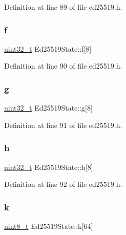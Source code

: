 Definition at line 89 of file ed25519.\+h.

\mbox{\label{structEd25519State_a168d3aecb5fe85de18f5b1262f92c8a1}} 
\subsubsection{\texorpdfstring{f}{f}}
{\footnotesize\ttfamily \hyperlink{stdint_8h_a435d1572bf3f880d55459d9805097f62}{uint32\+\_\+t} Ed25519\+State\+::f\mbox{[}8\mbox{]}}



Definition at line 90 of file ed25519.\+h.

\mbox{\label{structEd25519State_a79c9d128ae5b3c351159268164ca23d4}} 
\subsubsection{\texorpdfstring{g}{g}}
{\footnotesize\ttfamily \hyperlink{stdint_8h_a435d1572bf3f880d55459d9805097f62}{uint32\+\_\+t} Ed25519\+State\+::g\mbox{[}8\mbox{]}}



Definition at line 91 of file ed25519.\+h.

\mbox{\label{structEd25519State_a8d8b974786f20f7a3013f747808d2927}} 
\subsubsection{\texorpdfstring{h}{h}}
{\footnotesize\ttfamily \hyperlink{stdint_8h_a435d1572bf3f880d55459d9805097f62}{uint32\+\_\+t} Ed25519\+State\+::h\mbox{[}8\mbox{]}}



Definition at line 92 of file ed25519.\+h.

\mbox{\label{structEd25519State_a2d1736dc398ddcbb49e1b2e3cb5b7182}} 
\subsubsection{\texorpdfstring{k}{k}}
{\footnotesize\ttfamily \hyperlink{stdint_8h_aba7bc1797add20fe3efdf37ced1182c5}{uint8\+\_\+t} Ed25519\+State\+::k\mbox{[}64\mbox{]}}



